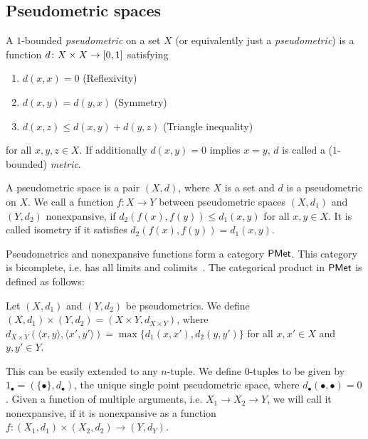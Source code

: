 \subsection{Pseudometric spaces}\label{c2:subsec:pseudometric_spaces}
A $1$-bounded \emph{pseudometric} on a set $X$ (or equivalently just a \emph{pseudometric}) is a function $d \colon X \times X \to \interval{0}{1}$ satisfying
\begin{enumerate}
	\item  $d(x,x)=0$ (Reflexivity)
	\item  $d(x,y)=d(y,x)$ ({Symmetry})
	\item  $d(x,z) \leq d(x, y) + d(y,z)$ (Triangle inequality)
\end{enumerate}
for all $x,y,z \in X$. If additionally $d(x,y)=0$ implies $x=y$, $d$ is called a ($1$-bounded) \emph{metric}. 
\begin{definition}
	A pseudometric space is a pair $(X, d)$, where $X$ is a set and $d$ is a pseudometric on $X$. We call a function $f \colon X \to Y$ between pseudometric spaces $(X,d_1)$ and $(Y,d_2)$ nonexpansive, if $d_2(f(x),f(y))\leq d_1(x,y)$ for all $x,y \in X$. It is called isometry if it satisfies $d_2(f(x),f(y))=d_1(x,y)$. 	
\end{definition}
Pseudometrics and nonexpansive functions form a category $\mathsf{PMet}$. This category is bicomplete, i.e. has all limits and colimits~\cite[Theorem~3.8]{Baldan:2018:Coalgebraic}. The categorical product in $\mathsf{PMet}$ is defined as follows:
\begin{definition}
Let $(X,d_1)$ and $(Y, d_2)$ be pseudometrics. We define $(X, d_1) \times (Y, d_2) = (X \times Y, d_{X \times Y})$, where $d_{X \times Y}(\langle x,y \rangle,\langle x',y' \rangle ) = \max \{d_1(x,x'), d_2(y,y')\}$ for all $x,x' \in X$ and $y,y' \in Y$.
\end{definition}
This can be easily extended to any $n$-tuple. We define $0$-tuples to be given by $1_{\bullet} = (\{\bullet\}, d_{\bullet})$, the unique single point pseudometric space, where $d_{\bullet}(\bullet,\bullet)=0$. Given a function of multiple arguments, i.e. $X_1 \to X_2 \to Y$, we will call it nonexpansive, if it is nonexpansive as a function $f \colon (X_1, d_{1}) \times (X_2, d_{2}) \to (Y, d_Y)$. 	


